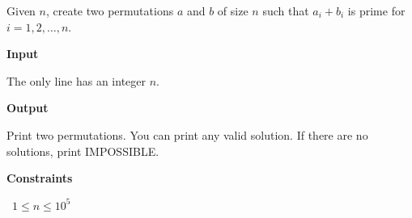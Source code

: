 Given $n$, create two permutations $a$ and $b$ of size $n$ such that $a_i+b_i$ is prime for $i=1,2,\dots,n$.

\vspace{0.3cm}\noindent\textbf{Input}

The only line has an integer $n$.

\vspace{0.3cm}\noindent\textbf{Output}

Print two permutations. You can print any valid solution. If there are no solutions, print IMPOSSIBLE.

\vspace{0.3cm}\noindent\textbf{Constraints}

\textbullet\ $1 \le n \le 10^5$